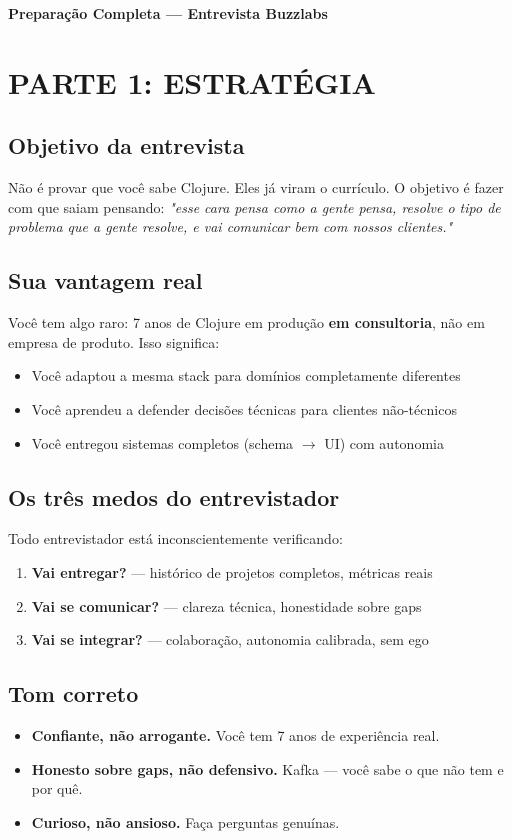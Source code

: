 \documentclass[10pt,a4paper]{article}
\begin{document}
\begin{center}
    {\huge \textbf{Preparação Completa — Entrevista Buzzlabs}}
\end{center}

\section*{PARTE 1: ESTRATÉGIA}

\subsection*{Objetivo da entrevista}
Não é provar que você sabe Clojure. Eles já viram o currículo. O objetivo é fazer com que saiam pensando: \textit{"esse cara pensa como a gente pensa, resolve o tipo de problema que a gente resolve, e vai comunicar bem com nossos clientes."}

\subsection*{Sua vantagem real}
Você tem algo raro: 7 anos de Clojure em produção \textbf{em consultoria}, não em empresa de produto. Isso significa:
\begin{itemize}
    \item Você adaptou a mesma stack para domínios completamente diferentes
    \item Você aprendeu a defender decisões técnicas para clientes não-técnicos
    \item Você entregou sistemas completos (schema $\to$ UI) com autonomia
\end{itemize}

\subsection*{Os três medos do entrevistador}
Todo entrevistador está inconscientemente verificando:
\begin{enumerate}
    \item \textbf{Vai entregar?} — histórico de projetos completos, métricas reais
    \item \textbf{Vai se comunicar?} — clareza técnica, honestidade sobre gaps
    \item \textbf{Vai se integrar?} — colaboração, autonomia calibrada, sem ego
\end{enumerate}

\subsection*{Tom correto}
\begin{itemize}
    \item \textbf{Confiante, não arrogante.} Você tem 7 anos de experiência real.
    \item \textbf{Honesto sobre gaps, não defensivo.} Kafka — você sabe o que não tem e por quê.
    \item \textbf{Curioso, não ansioso.} Faça perguntas genuínas.
\end{itemize}
\end{document}
